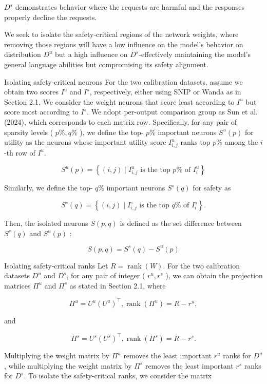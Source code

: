 \documentclass[10pt]{article}
\begin{document}
$D^{s}$ demonstrates behavior where the requests are harmful and the responses properly decline the requests.

We seek to isolate the safety-critical regions of the network weights, where removing those regions will have a low influence on the model's behavior on distribution $D^{u}$ but a high influence on $D^{s}$-effectively maintaining the model's general language abilities but compromising its safety alignment.

Isolating safety-critical neurons For the two calibration datasets, assume we obtain two scores $I^{u}$ and $I^{s}$, respectively, either using SNIP or Wanda as in Section 2.1. We consider the weight neurons that score least according to $I^{u}$ but score most according to $I^{s}$. We adopt per-output comparison group as Sun et al. (2024), which corresponds to each matrix row. Specifically, for any pair of sparsity levels ( $p \%, q \%$ ), we define the top- $p \%$ important neurons $S^{u}(p)$ for utility as the neurons whose important utility score $I_{i, j}^{u}$ ranks top $p \%$ among the $i$-th row of $I^{u}$.

$$
S^{u}(p)=\left\{(i, j) \mid I_{i, j}^{u} \text { is the top } p \% \text { of } I_{i}^{u}\right\}
$$

Similarly, we define the top- $q \%$ important neurons $S^{s}(q)$ for safety as

$$
S^{s}(q)=\left\{(i, j) \mid I_{i, j}^{s} \text { is the top } q \% \text { of } I_{i}^{s}\right\} .
$$

Then, the isolated neurons $S(p, q)$ is defined as the set difference between $S^{s}(q)$ and $S^{u}(p)$ :

$$
S(p, q)=S^{s}(q)-S^{u}(p)
$$

Isolating safety-critical ranks Let $R=\operatorname{rank}(W)$. For the two calibration datasets $D^{u}$ and $D^{s}$, for any pair of integer ( $r^{u}, r^{s}$ ), we can obtain the projection matrices $\Pi^{u}$ and $\Pi^{s}$ as stated in Section 2.1, where

$$
\Pi^{u}=U^{u}\left(U^{u}\right)^{\top}, \operatorname{rank}\left(\Pi^{u}\right)=R-r^{u},
$$

and

$$
\Pi^{s}=U^{s}\left(U^{s}\right)^{\top}, \operatorname{rank}\left(\Pi^{s}\right)=R-r^{s} .
$$

Multiplying the weight matrix by $\Pi^{u}$ removes the least important $r^{u}$ ranks for $D^{u}$, while multiplying the weight matrix by $\Pi^{s}$ removes the least important $r^{s}$ ranks for $D^{s}$. To isolate the safety-critical ranks, we consider the matrix
\end{document}
